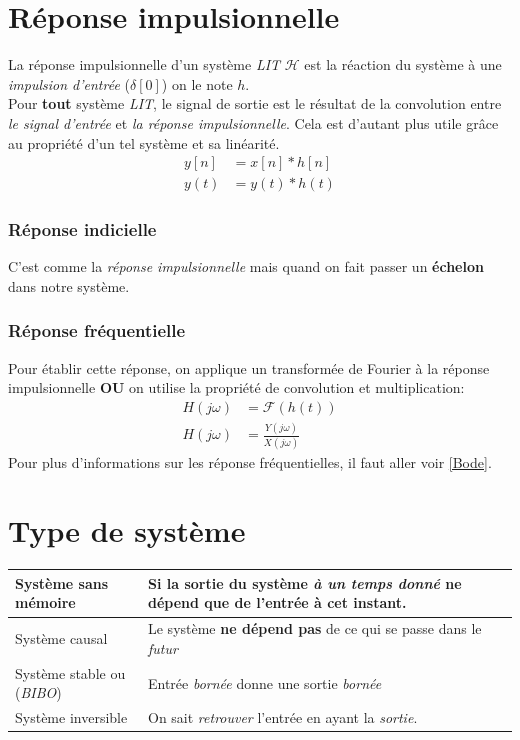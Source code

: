 \documentclass{report}
\begin{document}
\section{Réponse impulsionnelle}
La réponse impulsionnelle d'un système \textit{LIT} $\mathcal{H}$ est la réaction du système à une \textit{impulsion d'entrée} ($\delta[0]$) on le note $h$.\\

Pour \textbf{tout} système \textit{LIT}, le signal de sortie est le résultat de la convolution entre \textit{le signal d'entrée} et \textit{la réponse impulsionnelle}. Cela est d'autant plus utile grâce au propriété d'un tel système et sa linéarité.
\begin{align}
y[n] &= x[n] \ast h[n]\\
y(t) &= y(t) \ast h(t)
\end{align}

\subsubsection{Réponse indicielle}
C'est comme la \textit{réponse impulsionnelle} mais quand on fait passer un \textbf{échelon} dans notre système.

\subsubsection{Réponse fréquentielle}
Pour établir cette réponse, on applique un transformée de Fourier à la réponse impulsionnelle \textbf{OU} on utilise la propriété de convolution et multiplication:
\begin{align*}
H(j \omega) &= \mathcal{F}(h(t))\\
H(j \omega) &= \frac{Y(j \omega)}{X(j \omega)}
\end{align*}
Pour plus d'informations sur les réponse fréquentielles, il faut aller voir \ref{Bode}.

\section{Type de système}
\begin{center}
\begin{tabular}{|m{4cm}|m{10cm}|}
	\hline
	Système sans mémoire & Si la sortie du système \textit{à un temps donné} ne dépend que de l'entrée à \textbf{cet instant}.\\
	\hline
	Système causal & Le système \textbf{ne dépend pas} de ce qui se passe dans le \textit{futur}\\
	\hline
	Système stable ou (\textit{BIBO}) & Entrée \textit{bornée} donne une sortie \textit{bornée}\\
	\hline
	Système inversible & On sait \textit{retrouver} l'entrée en ayant la \textit{sortie}.\\
	\hline

\end{tabular}
\end{center}
\end{document}
